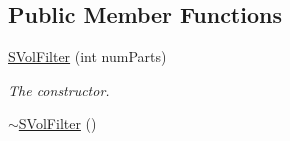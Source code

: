 \subsection*{Public Member Functions}
\begin{DoxyCompactItemize}
\item 
\hyperlink{classSVolFilter_a04a1a3024e1cf642833694e329f4e9e4}{S\+Vol\+Filter} (int num\+Parts)
\begin{DoxyCompactList}\small\item\em The constructor. \end{DoxyCompactList}\item 
\hyperlink{classSVolFilter_a5b894ffc4a62d9e441d9070df9727eb6}{$\sim$\+S\+Vol\+Filter} ()\hypertarget{classSVolFilter_a5b894ffc4a62d9e441d9070df9727eb6}{}\label{classSVolFilter_a5b894ffc4a62d9e441d9070df9727eb6}


\end{DoxyCompactItemize}

